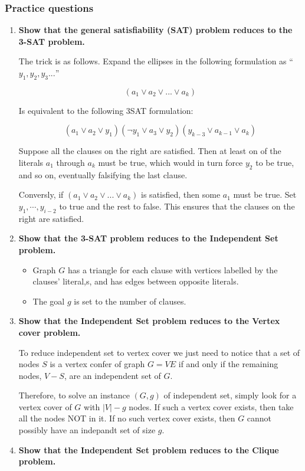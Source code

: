 \documentclass[a4paper,11pt]{article}
\begin{document}
\subsubsection{Practice questions}\label{practice-questions-21}

\begin{enumerate}
\def\labelenumi{\arabic{enumi}.}
\item
  \textbf{Show that the general satisfiability (SAT) problem reduces to
  the 3-SAT problem.}

  The trick is as follows. Expand the ellipses in the following
  formulation as ``$y_1, y_2, y_3 ...$''

  \[(a_1 \lor a_2 \lor ... \lor a_k)\]

  Is equivalent to the following 3SAT formulation:

  \[(a_1 \lor a_2 \lor y_1)(\lnot y_1 \lor a_3 \lor y_2)(y_{k - 3} \lor a_{k - 1} \lor a_k)\]

  Suppose all the clauses on the right are satisfied. Then at least on
  of the literals $a_1$ through $a_k$ must be true, which would in turn
  force $y_2$ to be true, and so on, eventually falsifying the last
  clause.

  Conversly, if $(a_1 \lor a_2 \lor ... \lor a_k)$ is satisfied, then
  some $a_1$ must be true. Set $y_1, \cdots, y_{i - 2}$ to true and the
  rest to false. This ensures that the clauses on the right are
  satisfied.
\item
  \textbf{Show that the 3-SAT problem reduces to the Independent Set
  problem.}

  \begin{itemize}
  \itemsep1pt\parskip0pt
  \item
    Graph $G$ has a triangle for each clause with vertices labelled by
    the clauses' literal,s, and has edges between opposite literals.
  \item
    The goal $g$ is set to the number of clauses.
  \end{itemize}
\item
  \textbf{Show that the Independent Set problem reduces to the Vertex
  cover problem.}

  To reduce independent set to vertex cover we just need to notice that
  a set of nodes $S$ is a vertex confer of graph $G = VE$ if and only if
  the remaining nodes, $V - S$, are an independent set of $G$.

  Therefore, to solve an instance $(G, g)$ of independent set, simply
  look for a vertex cover of $G$ with $|V| - g$ nodes. If such a vertex
  cover exists, then take all the nodes NOT in it. If no such vertex
  cover exists, then $G$ cannot possibly have an indepandt set of size
  $g$.
\item
  \textbf{Show that the Independent Set problem reduces to the Clique
  problem.}


\end{enumerate}
\end{document}
